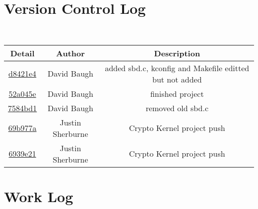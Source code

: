 \documentclass[10pt,drafclsnofoot,onecolumn]{IEEEtran}
\begin{document}
\section{Version Control Log}
\' \\ \centering
\begin{tabular}{c c c}
	\textbf{Detail} & \textbf{Author} & \textbf{Description}\\\hline
	
	\href{dirname "$origin"/basename "$origin" .git/commit/d8421e4c1c9dafedca6c0f887141d91d97e55b2e}{d8421e4} & David Baugh & added sbd.c, kconfig and Makefile editted but not added\\\hline
	\href{dirname "$origin"/basename "$origin" .git/commit/52a045e97dbb38253b5fb74100bfb2defd5a6b9b}{52a045e} & David Baugh & finished project\\\hline
	\href{dirname "$origin"/basename "$origin" .git/commit/7584bd1b23f60e808e3d8d5b16d95ffda4c4a55d}{7584bd1} & David Baugh & removed old sbd.c\\\hline
	\href{dirname "$origin"/basename "$origin" .git/commit/69b977a0b9cc36d22bcff524e5523b11a9c4421b}{69b977a} & Justin Sherburne & Crypto Kernel project push\\\hline
	\href{dirname "$origin"/basename "$origin" .git/commit/6939e21b15109231b66433b6a0b4fe5ab16dd54b}{6939e21} & Justin Sherburne & Crypto Kernel project push\\\hline
\end{tabular}

\section{Work Log}
\end{document}
